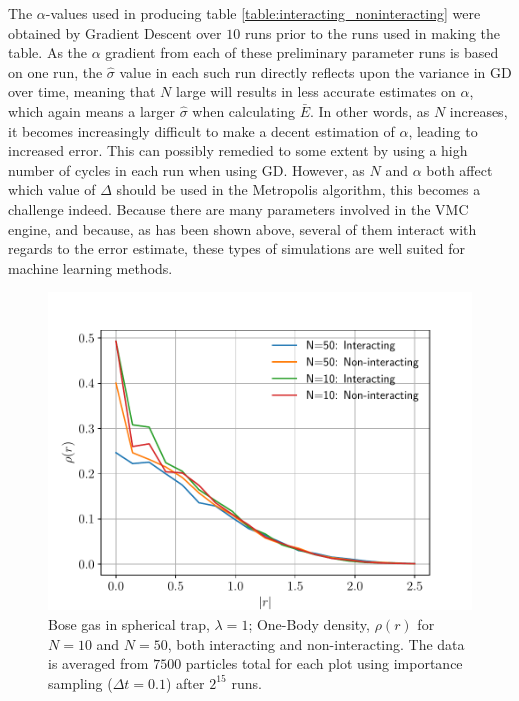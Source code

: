 \documentclass[%
oneside,                 %
final,                   %
10pt]{article}
\begin{document}
The $\alpha$-values used in producing table \ref{table:interacting_noninteracting} were obtained by Gradient Descent over $10$ runs prior to the runs used in making the table. As the $\alpha$ gradient from each of these preliminary parameter runs is based on one run, the $\hat \sigma$ value in each such run directly reflects upon the variance in GD over time, meaning that $N$ large will results in less accurate estimates on $\alpha$, which again means a larger $\hat \sigma$ when calculating $\bar E$. In other words, as $N$ increases, it becomes increasingly difficult to make a decent estimation of $\alpha$, leading to increased error. This can possibly remedied to some extent by using a high number of cycles in each run when using GD. However, as $N$ and $\alpha$ both affect which value of $\Delta$ should be used in the Metropolis algorithm, this becomes a challenge indeed. Because there are many parameters involved in the VMC engine, and because, as has been shown above, several of them interact with regards to the error estimate, these types of simulations are well suited for machine learning methods. 

\begin{figure}[!h]
        \centering 
         \includegraphics[scale=0.6]{../Results/densitites_plot.pdf} 
        \caption{Bose gas in spherical trap, $\lambda=1$; One-Body density, $\rho(r)$ for $N=10$ and $N=50$, both interacting and non-interacting. The data is averaged from $7500$ particles total for each plot using importance sampling ($\Delta t=0.1$) after $2^{15}$ runs.}
        \label{fig:densities}   
\end{figure}  
\end{document}
